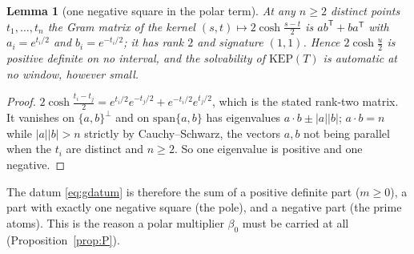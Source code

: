 \documentclass[11pt]{amsart}
\newtheorem{lemma}[theorem]{Lemma}
\theoremstyle{definition}
\theoremstyle{remark}
\begin{document}
\begin{lemma}[one negative square in the polar term]\label{lem:polar}
At any $n\ge2$ distinct points $t_1,\dots,t_n$ the Gram matrix of the kernel
$(s,t)\mapsto2\cosh\frac{s-t}2$ is $ab^{\mathsf T}+ba^{\mathsf T}$ with $a_i=e^{t_i/2}$ and
$b_i=e^{-t_i/2}$; it has rank $2$ and signature $(1,1)$. Hence $2\cosh\frac u2$ is positive definite
on no interval, and the solvability of $\mathrm{KEP}(T)$ is automatic at no window, however small.
\end{lemma}
\begin{proof}
$2\cosh\frac{t_i-t_j}2=e^{t_i/2}e^{-t_j/2}+e^{-t_i/2}e^{t_j/2}$, which is the stated rank-two matrix.
It vanishes on $\{a,b\}^\perp$ and on $\mathrm{span}\{a,b\}$ has eigenvalues $a\cdot b\pm|a||b|$;
$a\cdot b=n$ while $|a||b|>n$ strictly by Cauchy--Schwarz, the vectors $a,b$ not being parallel when
the $t_i$ are distinct and $n\ge2$. So one eigenvalue is positive and one negative.
\end{proof}
The datum \eqref{eq:gdatum} is therefore the sum of a positive definite part ($m\ge0$), a part with
exactly one negative square (the pole), and a negative part (the prime atoms). This is the reason a
polar multiplier $\beta_0$ must be carried at all (Proposition~\ref{prop:P}).
\end{document}
